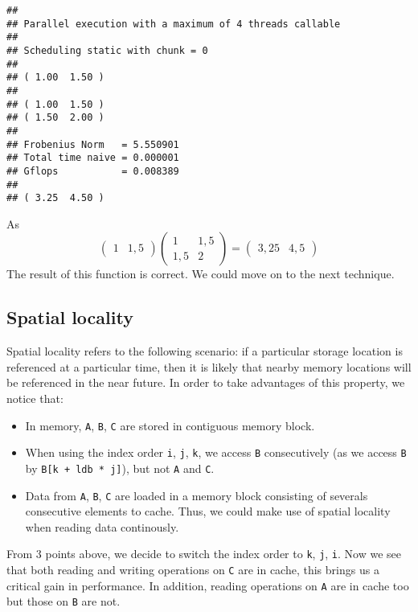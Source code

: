 \documentclass[
  12pt,
  xcolor = usenames,dvipsnames]{article}
\newcommand{\passthrough}[1]{#1}
\providecommand{\tightlist}{%
  \setlength{\itemsep}{0pt}\setlength{\parskip}{0pt}}
\begin{document}
\begin{lstlisting}
## 
## Parallel execution with a maximum of 4 threads callable
## 
## Scheduling static with chunk = 0
## 
## ( 1.00  1.50 )
## 
## ( 1.00  1.50 )
## ( 1.50  2.00 )
## 
## Frobenius Norm   = 5.550901
## Total time naive = 0.000001
## Gflops           = 0.008389
## 
## ( 3.25  4.50 )
\end{lstlisting}

As
\[
\begin{pmatrix}
1 & 1,5
\end{pmatrix}\begin{pmatrix}
1 & 1,5\\
1,5 & 2
\end{pmatrix}=\begin{pmatrix}
3,25 & 4,5
\end{pmatrix}
\]
The result of this function is correct. We could move on to the next technique.

\hypertarget{spatial-locality}{%
\subsection{Spatial locality}\label{spatial-locality}}

Spatial locality refers to the following scenario: if a particular storage location is referenced at a particular time, then it is likely that nearby memory locations will be referenced in the near future. In order to take advantages of this property, we notice that:

\begin{itemize}
\tightlist
\item
  In memory, \passthrough{\lstinline!A!}, \passthrough{\lstinline!B!}, \passthrough{\lstinline!C!} are stored in contiguous memory block.
\item
  When using the index order \passthrough{\lstinline!i!}, \passthrough{\lstinline!j!}, \passthrough{\lstinline!k!}, we access \passthrough{\lstinline!B!} consecutively (as we access \passthrough{\lstinline!B!} by \passthrough{\lstinline!B[k + ldb * j]!}), but not \passthrough{\lstinline!A!} and \passthrough{\lstinline!C!}.
\item
  Data from \passthrough{\lstinline!A!}, \passthrough{\lstinline!B!}, \passthrough{\lstinline!C!} are loaded in a memory block consisting of severals consecutive elements to cache. Thus, we could make use of spatial locality when reading data continously.
\end{itemize}

From 3 points above, we decide to switch the index order to \passthrough{\lstinline!k!}, \passthrough{\lstinline!j!}, \passthrough{\lstinline!i!}. Now we see that both reading and writing operations on \passthrough{\lstinline!C!} are in cache, this brings us a critical gain in performance. In addition, reading operations on \passthrough{\lstinline!A!} are in cache too but those on \passthrough{\lstinline!B!} are not.
\end{document}
